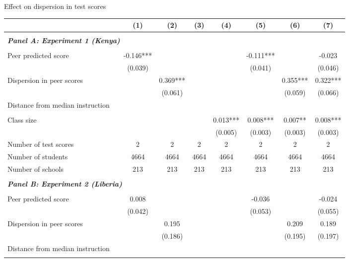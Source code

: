 \begin{center} 
\caption{\small Effect on dispersion in test scores} 
\label{tab:descriptives} 
\begin{scriptsize}
\begin{threeparttable}
\begin{tabular} {@{} l l c c c c c c c  @{}} \toprule \toprule
& &(1)&(2)&(3)&(4)&(5)&(6)&(7) \\ \midrule 
\\
\multicolumn{3}{l}{\textbf{\textit{Panel A: Experiment 1 (Kenya)}}} \\
\\
Peer predicted score &  & -0.146*** &  &  &  & -0.111*** &  & -0.023 \\
                 &  & (0.039) &  &  &  & (0.041) &  & (0.046) \\
Dispersion in peer scores &  &  & 0.369*** &  &  &  & 0.355*** & 0.322*** \\
                 &  &  & (0.061) &  &  &  & (0.059) & (0.066) \\
Distance from median instruction &  &  &  &  &  &  &  &  \\
                 &  &  &  &  &  &  &  &  \\
Class size &  &  &  &  & 0.013*** & 0.008*** & 0.007** & 0.008*** \\
                 &  &  &  &  & (0.005) & (0.003) & (0.003) & (0.003) \\
\midrule
Number of test scores &  & 2 & 2 & 2 & 2 & 2 & 2 & 2 \\
Number of students &  & 4664 & 4664 & 4664 & 4664 & 4664 & 4664 & 4664 \\
Number of schools &  & 213 & 213 & 213 & 213 & 213 & 213 & 213 \\
 \midrule
\\
\multicolumn{3}{l}{\textbf{\textit{Panel B: Experiment 2 (Liberia)}}} \\
\\
Peer predicted score &  & 0.008 &  &  &  & -0.036 &  & -0.024 \\
                 &  & (0.042) &  &  &  & (0.053) &  & (0.055) \\
Dispersion in peer scores &  &  & 0.195 &  &  &  & 0.209 & 0.189 \\
                 &  &  & (0.186) &  &  &  & (0.195) & (0.197) \\
Distance from median instruction &  &  &  &  &  &  &  &  \\
                 &  &  &  &  &  &  &  &  \\

\end{tabular}
\end{threeparttable}
\end{scriptsize}
\end{center}
